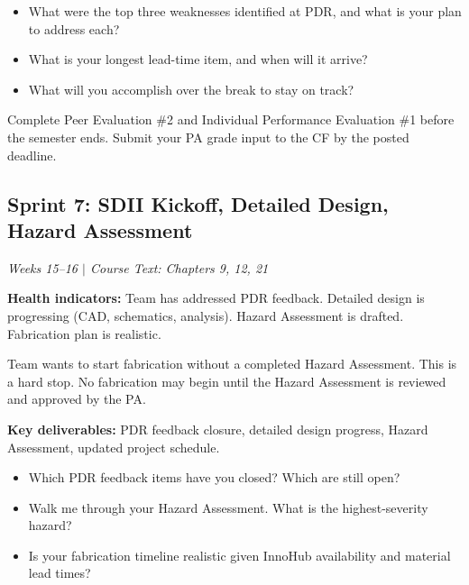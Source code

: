 \begin{paquestion}
\begin{itemize}[nosep,leftmargin=1.5em]
\item What were the top three weaknesses identified at PDR, and what is your plan to address each?
\item What is your longest lead-time item, and when will it arrive?
\item What will you accomplish over the break to stay on track?
\end{itemize}
\end{paquestion}

\begin{paaction}
Complete Peer Evaluation \#2 and Individual Performance Evaluation \#1 before the semester ends. Submit your PA grade input to the CF by the posted deadline.
\end{paaction}


\subsection{Sprint 7: SDII Kickoff, Detailed Design, Hazard Assessment}
\textit{Weeks 15--16 $|$ Course Text: Chapters 9, 12, 21}

\textbf{Health indicators:} Team has addressed PDR feedback. Detailed design is progressing (CAD, schematics, analysis). Hazard Assessment is drafted. Fabrication plan is realistic.

\begin{redflag}
Team wants to start fabrication without a completed Hazard Assessment. This is a hard stop. No fabrication may begin until the Hazard Assessment is reviewed and approved by the PA.
\end{redflag}

\textbf{Key deliverables:} PDR feedback closure, detailed design progress, Hazard Assessment, updated project schedule.

\begin{paquestion}
\begin{itemize}[nosep,leftmargin=1.5em]
\item Which PDR feedback items have you closed? Which are still open?
\item Walk me through your Hazard Assessment. What is the highest-severity hazard?
\item Is your fabrication timeline realistic given InnoHub availability and material lead times?
\end{itemize}
\end{paquestion}

